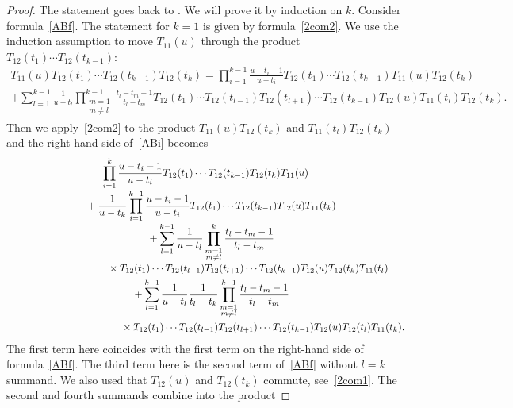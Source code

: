 \documentclass[10pt,a4paper]{amsart}
\numberwithin{equation}{section}
\begin{document}
\begin{proof}
The statement goes back to \cite{FT}. We will prove it by induction on $k$. Consider formula~\eqref{ABf}.
The statement for $k=1$ is given by formula~\eqref{2com2}. We use the induction assumption to move $T_{11}(u)$ through the product $T_{12} (t_1) \cdots T_{12} (t_{k-1})$:
\begin{gather} \label{ABi}
T_{11} (u) T_{12} (t_1) \cdots T_{12} (t_{k-1}) T_{12} (t_{k})=\prod_{i=1}^{k-1}\frac{u-t_i-1}{u-t_i} T_{12} (t_1)\cdots T_{12} (t_{k-1}) T_{11} (u)T_{12} (t_{k})\\[-1mm]
+\sum_{l=1}^{k-1} \frac{1}{u-t_l}\prod_{\substack{m=1\\m\neq l}}^{k-1} \frac{t_l-t_m-1}{t_l-t_m} T_{12} (t_1)\cdots T_{12} (t_{l-1}) T_{12} (t_{l+1})\cdots T_{12} (t_{k-1}) T_{12} (u)T_{11} (t_l)T_{12} (t_{k}).\nonumber
\end{gather}
Then we apply~\eqref{2com2} to the product $ T_{11} (u)T_{12} (t_{k})$ and $T_{11} (t_l)T_{12} (t_{k})$ and the right-hand side of~\eqref{ABi} becomes
\begin{gather*}
 \prod_{i=1}^{k}\frac{u-t_i-1}{u-t_i} T_{12} (t_1)\cdots T_{12} (t_{k-1}) T_{12}(t_{k}) T_{11} (u)\\[-1mm]
\quad{}+\frac{1}{u-t_{k}} \prod_{i=1}^{k-1}\frac{u-t_i-1}{u-t_i} T_{12} (t_1)\cdots T_{12} (t_{k-1}) T_{12}(u) T_{11}(t_k) \\[-1mm]
\quad{}+ \sum_{l=1}^{k-1} \frac{1}{u-t_l}\prod_{\substack{m=1\\m\neq l}}^k \frac{t_l-t_m-1}{t_l-t_m} \\[-1mm]
\quad\hphantom{+ \sum_{l=1}^{k-1} \frac{1}{u-t_l}\prod_{\substack{m=1\\m\neq l}}^k}{}\, \times T_{12} (t_1)\cdots T_{12} (t_{l-1}) T_{12} (t_{l+1})\cdots T_{12} (t_{k-1})T_{12} (u) T_{12} (t_{k})T_{11} (t_l)\\
\quad{} +\sum_{l=1}^{k-1} \frac{1}{u-t_l}\frac{1}{t_l-t_k}\prod_{\substack{m=1\\m\neq l}}^{k-1} \frac{t_l-t_m-1}{t_l-t_m} \\
\quad\hphantom{+\sum_{l=1}^{k-1} \frac{1}{u-t_l}\frac{1}{t_l-t_k}\prod_{\substack{m=1\\m\neq l}}^{k-1}}{}\, \times T_{12} (t_1)\cdots T_{12} (t_{l-1}) T_{12} (t_{l+1})\cdots T_{12} (t_{k-1})T_{12} (u) T_{12} (t_l)T_{11} (t_k).
\end{gather*}
The first term here coincides with the first term on the right-hand side of formula~\eqref{ABf}. The third term here is the second term of~\eqref{ABf} without $l=k$ summand. We also used that $T_{12}(u)$ and $T_{12}(t_k)$ commute, see~\eqref{2com1}. The second and fourth summands combine into the product

\end{proof}
\end{document}
